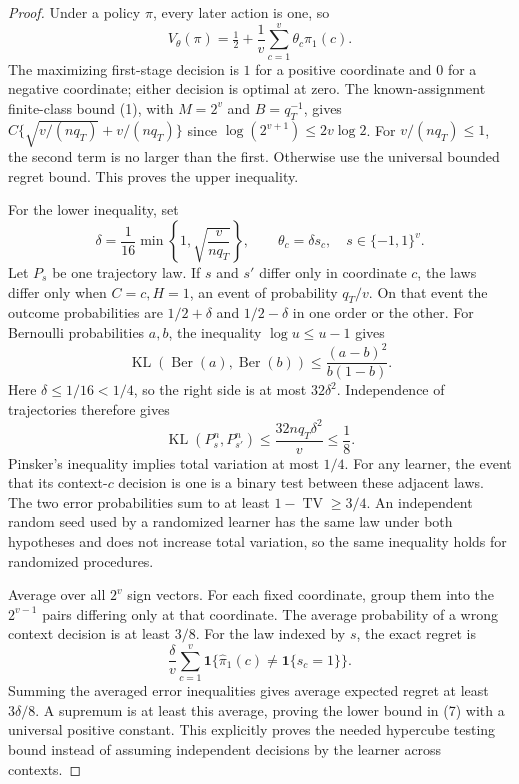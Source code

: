 \documentclass[11pt]{article}
\theoremstyle{definition}
\begin{document}
\begin{proof}
Under a policy $\pi$, every later action is one, so
\[
 V_\theta(\pi)=\tfrac12+
             \frac1v\sum_{c=1}^v\theta_c\pi_1(c).
\]
The maximizing first-stage decision is $1$ for a positive coordinate
and $0$ for a negative coordinate; either decision is optimal at zero.
The known-assignment finite-class bound (1), with
$M=2^v$ and $B=q_T^{-1}$, gives
$C\{\sqrt{v/(nq_T)}+v/(nq_T)\}$ since
$\log(2^{v+1})\le2v\log2$. For $v/(nq_T)\le1$, the second
term is no larger than the first. Otherwise use the universal bounded
regret bound. This proves the upper inequality.

For the lower inequality, set
\[
 \delta=\frac1{16}\min\left\{1,\sqrt{\frac{v}{nq_T}}\right\},
 \qquad \theta_c=\delta s_c,\quad s\in\{-1,1\}^v.
\]
Let $P_s$ be one trajectory law. If $s$ and $s'$ differ only in
coordinate $c$, the laws differ only when $C=c,H=1$, an event of
probability $q_T/v$. On that event the outcome probabilities are
$1/2+\delta$ and $1/2-\delta$ in one order or the other.
For Bernoulli probabilities $a,b$, the inequality
$\log u\le u-1$ gives
\[
 \operatorname{KL}(\operatorname{Ber}(a),\operatorname{Ber}(b))
 \le\frac{(a-b)^2}{b(1-b)}.
\]
Here $\delta\le1/16<1/4$, so the right side is at most
$32\delta^2$. Independence of trajectories therefore gives
\[
 \operatorname{KL}(P_s^n,P_{s'}^n)
 \le\frac{32nq_T\delta^2}{v}\le\frac18.
\]
Pinsker's inequality implies total variation at most $1/4$.
For any learner, the event that its context-$c$ decision is one is a
binary test between these adjacent laws. The two error probabilities
sum to at least $1-\operatorname{TV}\ge3/4$.
An independent random seed used by a randomized learner has the same
law under both hypotheses and does not increase total variation, so
the same inequality holds for randomized procedures.

Average over all $2^v$ sign vectors. For each fixed coordinate, group
them into the $2^{v-1}$ pairs differing only at that coordinate.
The average probability of a wrong context decision is at least $3/8$.
For the law indexed by $s$, the exact regret is
\[
 \frac{\delta}{v}\sum_{c=1}^v
 \mathbf1\{\widehat\pi_1(c)\ne\mathbf1\{s_c=1\}\}.
\]
Summing the averaged error inequalities gives average expected regret
at least $3\delta/8$. A supremum is at least this average, proving
the lower bound in (7) with a universal positive constant.
This explicitly proves the needed hypercube testing bound instead of
assuming independent decisions by the learner across contexts.
\end{proof}
\end{document}
